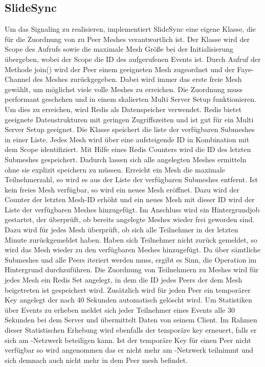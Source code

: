 \subsection{SlideSync}
Um das Signaling zu realisieren, implementiert SlideSync eine eigene Klasse, die für die Zuordnung von \clients zu Peer Meshes verantwortlich ist. Der Klasse wird der Scope des Aufrufs sowie die maximale Mesh Größe bei der Initialisierung übergeben, wobei der Scope die ID des aufgerufenen Events ist. Durch Aufruf der Methode join() wird der Peer einem geeigneten Mesh zugeordnet und der Faye-Channel des Meshes zurückgegeben. Dabei wird immer das erste freie Mesh gewählt, um möglichst viele volle Meshes zu erreichen. 
Die Zuordnung muss performant geschehen und in einem skalierten Multi Server Setup funktionieren. Um dies zu erreichen, wird Redis als Datenspeicher verwendet. Redis bietet geeignete Datenstrukturen mit geringen Zugriffszeiten und ist gut für ein Multi Server Setup geeignet. 
Die Klasse speichert die liste der verfügbaren Submeshes in einer Liste. Jedes Mesh wird über eine aufsteigende ID in Kombination mit dem Scope identifiziert. Mit Hilfe eines Redis Counters wird die ID des letzten Submeshes gespeichert. Dadurch lassen sich alle angelegten Meshes ermitteln ohne sie explizit speichern zu müssen. Erreicht ein Mesh die maximale Teilnehmerzahl, so wird es aus der Liste der verfügbaren Submeshes entfernt. Ist kein freies Mesh verfügbar, so wird ein neues Mesh eröffnet. Dazu wird der Counter der letzten Mesh-ID erhöht und ein neues Mesh mit dieser ID wird der Liste der verfügbaren Meshes hinzugefügt. Im Anschluss wird ein Hintergrundjob gestartet, der überprüft, ob bereits angelegte Meshes wieder frei geworden sind. Dazu wird für jedes Mesh überprüft, ob sich alle Teilnehmer in der letzten Minute zurückgemeldet haben. Haben sich Teilnehmer nicht zurück gemeldet, so wird das Mesh wieder zu den verfügbaren Meshes hinzugefügt. Da über sämtliche Submeshes und alle Peers iteriert werden muss, ergibt es Sinn, die Operation im Hintergrund durchzuführen.
Die Zuordnung von Teilnehmern zu Meshes wird für jedes Mesh ein Redis Set angelegt, in dem die ID jedes Peers der dem Mesh beigetreten ist gespeichert wird. Zusätzlich wird für jeden Peer ein temporärer Key angelegt der nach 40 Sekunden automatisch gelöscht wird. Um Statistiken über Events zu erheben meldet sich jeder Teilnehmer eines Events alle 30 Sekunden bei dem Server und übermittelt Daten von seinem Client. Im Rahmen dieser Statistischen Erhebung wird ebenfalls der temporäre key erneuert, falls er sich am \pTp-Netzwerk beteiligen kann. Ist der temporäre Key für einen Peer nicht verfügbar so wird angenommen das er nicht mehr am \pTp-Netzwerk teilnimmt und sich demnach auch nicht mehr in dem Peer mesh befindet.

